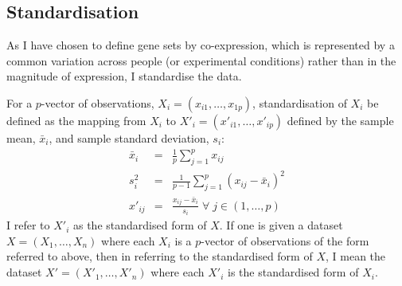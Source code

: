 \documentclass[12pt]{article} %
\begin{document}
	
	
	

	
	\subsection{Standardisation} \label{sec:standardisation}
	As I have chosen to define gene sets by co-expression, which is represented by a common variation across people (or experimental conditions) rather than in the magnitude of expression, I standardise the data.
	
	For a $p$-vector of observations, $X_i=(x_{i1},\ldots,x_{1p})$, standardisation of $X_i$ be defined as the mapping from $X_i$ to $X'_i=(x'_{i1},\ldots,x'_{ip})$ defined by the sample mean, $\bar{x}_i$, and sample standard deviation, $s_i$:
	\begin{eqnarray} \label{eqn:standardisation}
	\bar{x}_i &=& \frac{1}{p}\sum_{j=1}^p x_{ij} \\
	s_i^2 &=& \frac{1}{p - 1}\sum_{j=1}^p \left( x_{ij} - \bar{x}_i \right) ^2 \\
	x'_{ij} &=& \frac{x_{ij}- \bar{x}_i}{s_i} \; \forall \; j \in (1,\ldots,p)
	\end{eqnarray}
	I refer to $X'_i$ as the standardised form of $X$. If one is given a dataset $X=(X_1,\ldots,X_n)$ where each $X_i$ is a $p$-vector of observations of the form referred to above, then in referring to the standardised form of $X$, I mean the dataset $X'=(X'_1,\ldots,X'_n)$ where each $X'_i$ is the standardised form of $X_i$.
	
\end{document}

